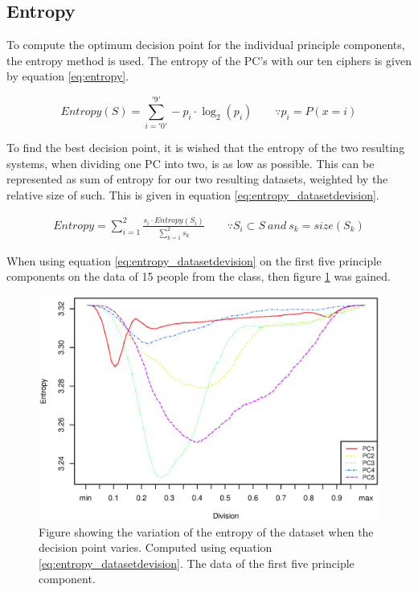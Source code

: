 \subsection{Entropy}
To compute the optimum decision point for the individual principle components, the entropy method is used.
The entropy of the PC's with our ten ciphers is given by equation \ref{eq:entropy}.

\begin{equation}
Entropy(S) = \sum_{i = '0'}^{'9'} -p_i \cdot \log_2(p_i) 
\qquad \because p_i = P(x = i)
\label{eq:entropy}
\end{equation}

To find the best decision point, it is wished that the entropy of the two resulting systems, when dividing one PC into two, is as low as possible.
This can be represented as sum of entropy for our two resulting datasets, weighted by the relative size of such.
This is given in equation \ref{eq:entropy_datasetdevision}.

\begin{eqnarray}
Entropy = \sum_{i = 1}^{2} \frac{s_i \cdot Entropy(S_i)}{\sum_{k = 1}^{2} s_k} 
\qquad \because S_i \subset S\ and\ s_k = size(S_k)
\label{eq:entropy_datasetdevision}
\end{eqnarray}

When using equation \ref{eq:entropy_datasetdevision} on the first five principle components on the data of 15 people from the class, then figure \ref{fig:entropy_pc5} was gained.

\begin{figure}[H]
\centering
\includegraphics[width = 0.95 \textwidth]{graphics/entropy_pc}
\caption{Figure showing the variation of the entropy of the dataset when the decision point varies. Computed using equation \ref{eq:entropy_datasetdevision}. The data of the first five principle component.}
\label{fig:entropy_pc5}
\end{figure}


